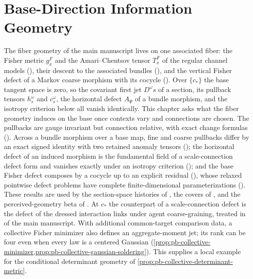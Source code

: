 \chapter{Base-Direction Information Geometry}
\label{ch:pullback-geometry}

The fiber geometry of the main manuscript lives on one associated fiber: the Fisher metric
\(g^F_x\) and the Amari--Chentsov tensor \(T^F_x\) of the regular channel models
(), their descent to the associated bundles
(), and the vertical Fisher defect of a Markov coarse
morphism with its cocycle (). Over
\(\{c_*\}\) the base tangent space is zero, so the covariant first jet \(D^\omega s\) of a section,
its pullback tensors \(h_s^\omega\) and \(c_s^\omega\), the horizontal defect \(A_\Psi\) of a
bundle morphism, and the isotropy criterion below all vanish identically. This chapter asks what the
fiber geometry induces on the base once contexts vary and connections are chosen. The pullbacks are
gauge invariant but connection relative, with exact change formulas
(). Across a bundle
morphism over a base map, fine and coarse pullbacks differ by an exact signed identity with two
retained anomaly tensors (); the horizontal defect of an induced
morphism is the fundamental field of a scale-connection defect form and vanishes exactly under an
isotropy criterion (); and the base Fisher defect composes by a
cocycle up to an explicit residual (), whose relaxed pointwise
defect problems have complete finite-dimensional parameterizations
(). These
results are used by the section-space histories of , the covers of
, and the perceived-geometry beta of . At
\(c_*\) the counterpart of a scale-connection defect is the defect of the dressed interaction links
under agent coarse-graining, treated in  of the main manuscript.
With additional common-target comparison data, a collective Fisher minimizer also defines an
aggregate-moment jet; its rank can be four even when every law is a centered Gaussian
(\cref{prop:pb-collective-minimizer,prop:pb-collective-gaussian-soldering}). This supplies a local
example for the conditional determinant geometry of \cref{prop:pb-collective-determinant-metric}.

